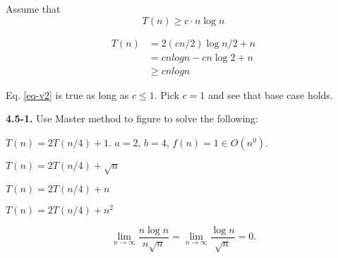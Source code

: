 \documentclass[11pt,a4paper]{article}
\renewcommand{\leq}{\leqslant}
\renewcommand{\geq}{\geqslant}
\begin{document}
Assume that
\begin{equation}
\label{eq-third}
T(n) \geq c \cdot n \log{n}
\end{equation}

\begin{equation}
\label{eq-v2}
\begin{split}
	T(n)&= 2 (cn/2) \log{n/2} + n \\
		&= cn log{n} - cn\log{2} + n \\
		& \geq cnlog{n}
\end{split}
\end{equation}

Eq. \ref{eq-v2} is true as long as $c \leq 1$. Pick $c = 1$ and see that base case holds.


\noindent\textbf{4.5-1.} Use Master method to figure to solve the following:

\begin{description}
	\item $T(n) = 2T(n/4) + 1$. $a = 2$, $b=4$, $f(n) = 1 \in O(n^0)$.

	\item $T(n) = 2T(n/4) + \sqrt{n}$
	\item $T(n) = 2T(n/4) + n$
	\item $T(n) = 2T(n/4) + n^2$
\end{description}

\[
\lim_{n\to\infty} \frac{n\log{n}}{n \sqrt{n}} = \lim_{n\to\infty} \frac{\log{n}}{\sqrt{n}} = 0.
\]
\end{document}
